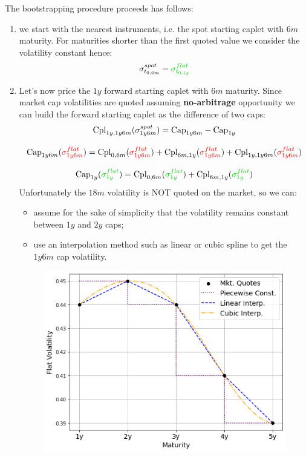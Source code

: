 \documentclass[12pt,a4paper]{article}
\begin{document}
\begin{question}
The bootstrapping procedure proceeds has follows:
\begin{enumerate}
\item we start with the nearest instruments, i.e. the spot starting caplet with $6m$ maturity. For maturities shorter than the first quoted value we consider the volatility constant hence:
\begin{equation}
\sigma^{spot}_{t_{0,6m}}=\textcolor{ipython-green}{\sigma^{flat}_{t_{0,1y}}}
\end{equation}
\item Let’s now price the $1y$ forward starting caplet with $6m$ maturity. Since market cap volatilities are quoted assuming \textbf{no-arbitrage} opportunity we can build the forward starting caplet as the difference of two caps:
\begin{equation}
\begin{gathered}
\text{Cpl}_{1y, 1y6m}(\sigma^{spot}_{1y6m})=\text{Cap}_{1y6m}-\text{Cap}_{1y} \\[0.3cm]
\text{Cap}_{1y6m}(\textcolor{red}{\sigma^{flat}_{1y6m}})=\text{Cpl}_{0,6m}(\textcolor{red}{\sigma^{flat}_{1y6m}}) + \text{Cpl}_{6m,1y}(\textcolor{red}{\sigma^{flat}_{1y6m}}) + \text{Cpl}_{1y,1y6m}(\textcolor{red}{\sigma^{flat}_{1y6m}}) \\[0.3cm]
\text{Cap}_{1y}(\textcolor{ipython-green}{\sigma^{flat}_{1y}})=\text{Cpl}_{0,6m}(\textcolor{ipython-green}{\sigma^{flat}_{1y}}) + \text{Cpl}_{6m,1y}(\textcolor{ipython-green}{\sigma^{flat}_{1y}}) 
\end{gathered}
\end{equation}
Unfortunately the $18m$ volatility is NOT quoted on the market, so we can:
\begin{itemize}
  \item assume for the sake of simplicity that the volatility remains constant between $1y$ and $2y$ caps;
  \item use an interpolation method such as linear or cubic spline to get the $1y6m$ cap volatility.
\end{itemize}

\begin{figure}[h]
\begin{center}
\includegraphics[width=0.6\linewidth]{addons/flat_volatilities}
\end{center}
\label{fig:flat_volatilities}
\end{figure}


\end{enumerate}
\end{question}
\end{document}
